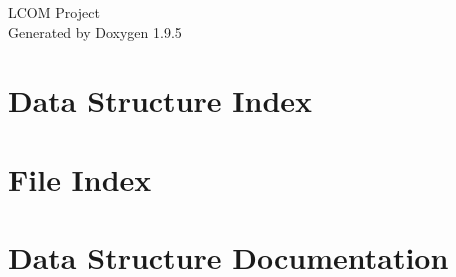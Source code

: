 \documentclass[twoside]{book}
\newcommand{\+}{\discretionary{\mbox{\scriptsize$\hookleftarrow$}}{}{}}
\newcommand{\clearemptydoublepage}{%
    \newpage{\pagestyle{empty}\cleardoublepage}%
  }
\begin{document}
  \raggedbottom
    \hypersetup{pageanchor=false,
                bookmarksnumbered=true,
                pdfencoding=unicode
               }
  \begin{titlepage}
  \vspace*{7cm}
  \begin{center}%
  {\Large LCOM Project}\\
  \vspace*{1cm}
  {\large Generated by Doxygen 1.9.5}\\
  \end{center}
  \end{titlepage}
  \clearemptydoublepage
  \tableofcontents
  \clearemptydoublepage
  \hypersetup{pageanchor=true}
\chapter{Data Structure Index}

\chapter{File Index}

\chapter{Data Structure Documentation}






\end{document}
